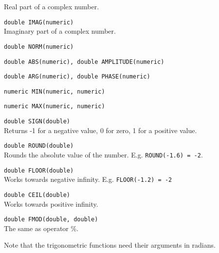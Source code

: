 \begin{description}
    Real part of a complex number.
  \item[] \texttt{double IMAG(numeric)}\\
    Imaginary part of a complex number.
  \item[] \texttt{double NORM(numeric)}
  \item[] \texttt{double ABS(numeric),  double AMPLITUDE(numeric)}
  \item[] \texttt{double ARG(numeric),  double PHASE(numeric)}
  \item[] \texttt{numeric MIN(numeric, numeric)}
  \item[] \texttt{numeric MAX(numeric, numeric)}
  \item[] \texttt{double SIGN(double)}\\
    Returns -1 for a negative value, 0 for zero, 1 for a positive value.
  \item[] \texttt{double ROUND(double)}\\
    Rounds the absolute value of the number.
    E.g. \texttt{ROUND(-1.6) = -2}.
  \item[] \texttt{double FLOOR(double)}\\
    Works towards negative infinity.
    E.g. \texttt{FLOOR(-1.2) = -2}
  \item[] \texttt{double CEIL(double)}\\
    Works towards positive infinity.
  \item[] \texttt{double FMOD(double, double)}\\
    The same as operator \%.
\end{description}
Note that the trigonometric functions need their arguments in radians.

